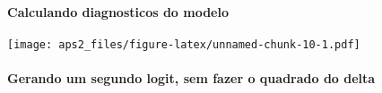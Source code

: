 \documentclass[
]{article}
\newenvironment{Shaded}{\begin{snugshade}}{\end{snugshade}}
\newcommand{\AttributeTok}[1]{\textcolor[rgb]{0.77,0.63,0.00}{#1}}
\newcommand{\FunctionTok}[1]{\textcolor[rgb]{0.00,0.00,0.00}{#1}}
\newcommand{\NormalTok}[1]{#1}
\newcommand{\OtherTok}[1]{\textcolor[rgb]{0.56,0.35,0.01}{#1}}
\newcommand{\SpecialCharTok}[1]{\textcolor[rgb]{0.00,0.00,0.00}{#1}}
\begin{document}
\hypertarget{calculando-diagnosticos-do-modelo}{%
\paragraph{Calculando diagnosticos do
modelo}\label{calculando-diagnosticos-do-modelo}}

\begin{Shaded}
\end{Shaded}

\texttt{[image: aps2\_files/figure-latex/unnamed-chunk-10-1.pdf]}

\hypertarget{gerando-um-segundo-logit-sem-fazer-o-quadrado-do-delta}{%
\paragraph{Gerando um segundo logit, sem fazer o quadrado do
delta}\label{gerando-um-segundo-logit-sem-fazer-o-quadrado-do-delta}}
\end{document}
